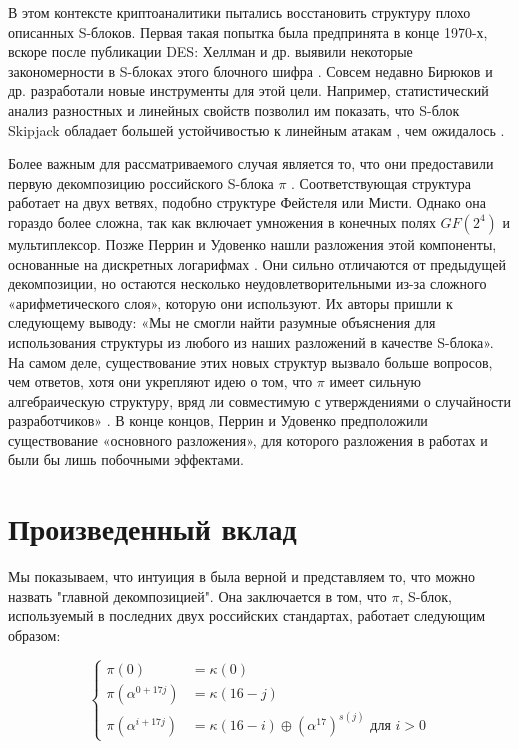 В этом контексте криптоаналитики пытались восстановить структуру плохо описанных S-блоков. Первая такая попытка была предпринята в конце 1970-х, вскоре после публикации DES: Хеллман и др. выявили некоторые закономерности в S-блоках этого блочного шифра \cite{HMS76}. Совсем недавно Бирюков и др. разработали новые инструменты для этой цели. Например, статистический анализ разностных и линейных свойств позволил им показать, что S-блок Skipjack обладает большей устойчивостью к линейным атакам \cite{Mat94}, чем ожидалось \cite{BP15}.

Более важным для рассматриваемого случая является то, что они предоставили первую декомпозицию российского S-блока \(\pi\) \cite{BPU16a, BPU16b}. Соответствующая структура работает на двух ветвях, подобно структуре Фейстеля или Мисти. Однако она гораздо более сложна, так как включает умножения в конечных полях \(GF(2^4)\) и мультиплексор. Позже Перрин и Удовенко нашли разложения этой компоненты, основанные на дискретных логарифмах \cite{PU16}. Они сильно отличаются от предыдущей декомпозиции, но остаются несколько неудовлетворительными из-за сложного «арифметического слоя», которую они используют. Их авторы пришли к следующему выводу: «Мы не смогли найти разумные объяснения для использования структуры из любого из наших разложений в качестве S-блока». На самом деле, существование этих новых структур вызвало больше вопросов, чем ответов, хотя они укрепляют идею о том, что \(\pi\) имеет сильную алгебраическую структуру, вряд ли совместимую с утверждениями о случайности разработчиков» \cite{PU16}. В конце концов, Перрин и Удовенко предположили существование «основного разложения», для которого разложения в работах \cite{BPU16a} и \cite{PU16} были бы лишь побочными эффектами.

\section*{Произведенный вклад}

Мы показываем, что интуиция в \cite{PU16} была верной и представляем то, что можно назвать "главной декомпозицией". Она заключается в том, что \(\pi\), S-блок, используемый в последних двух российских стандартах, работает следующим образом:

$$
\begin{cases}\pi(0) & =\kappa(0) \\ \pi\left(\alpha^{0+17 j}\right) & =\kappa(16-j) \\ \pi\left(\alpha^{i+17 j}\right) & =\kappa(16-i) \oplus\left(\alpha^{17}\right)^{s(j)} \text { для } i>0\end{cases}
$$

